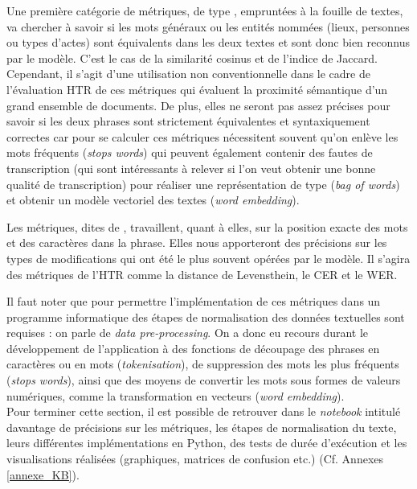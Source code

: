 Une première catégorie de métriques, de type , empruntées à la fouille de textes, va chercher à savoir si les mots généraux ou les entités nommées (lieux, personnes ou types d'actes) sont équivalents dans les deux textes et sont donc bien reconnus par le modèle. C'est le cas de la similarité cosinus et de l'indice de Jaccard. Cependant, il s'agit d'une utilisation non conventionnelle dans le cadre de l'évaluation HTR de ces métriques qui évaluent la proximité sémantique d'un grand ensemble de documents. De plus, elles ne seront pas assez précises pour savoir si les deux phrases sont strictement équivalentes et syntaxiquement correctes car pour se calculer ces métriques nécessitent souvent qu'on enlève les mots fréquents (\textit{stops words}) qui peuvent également contenir des fautes de transcription (qui sont intéressants à relever si l'on veut obtenir une bonne qualité de transcription) pour réaliser une représentation de type  (\textit{bag of words}) et obtenir un modèle vectoriel des textes (\textit{word embedding}).

Les métriques, dites de , travaillent, quant à elles, sur la position exacte des mots et des caractères dans la phrase. Elles nous apporteront des précisions sur les types de modifications qui ont été le plus souvent opérées par le modèle. Il s'agira des métriques  de l'HTR comme la distance de Levensthein, le CER et le WER.

Il faut noter que pour permettre l'implémentation de ces métriques dans un programme informatique des étapes de normalisation des données textuelles sont requises : on parle de \textit{data pre-processing}. On a donc eu recours durant le développement de l'application à des fonctions de découpage des phrases en caractères ou en mots (\textit{tokenisation}), de suppression des mots les plus fréquents (\textit{stops words}), ainsi que des moyens de convertir les mots sous formes de valeurs numériques, comme la transformation en vecteurs (\textit{word embedding}).\\

Pour terminer cette section, il est possible de retrouver dans le \textit{notebook} intitulé  davantage de précisions sur les métriques, les étapes de normalisation du texte, leurs différentes implémentations en Python, des tests de durée d'exécution et les visualisations réalisées (graphiques, matrices de confusion etc.) (Cf. Annexes \ref{annexe_KB}).\\
\clearpage
\thispagestyle{empty}
